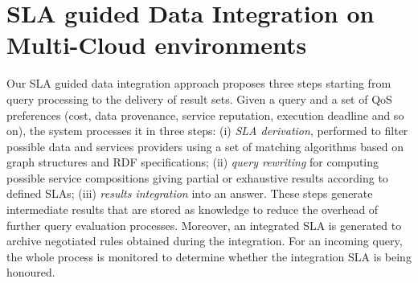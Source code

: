 \documentclass{llncs}
\begin{document}

  


 
 



\section{SLA guided Data Integration on Multi-Cloud environments}\label{sec:approach}




Our SLA guided data  integration approach proposes three steps starting from  query processing   to the delivery of  result sets.
Given a query and a set of QoS preferences (cost, data provenance, service reputation, execution deadline and so on), the system processes it in three steps:  (i)  {\em SLA derivation}, performed to filter possible data and services providers using a set of matching algorithms based on  graph structures and RDF specifications;
(ii)  {\em query rewriting} for computing possible service compositions giving partial or exhaustive  results according to defined SLAs; (iii)  {\em results  integration} into an answer. 
These steps generate intermediate results that are stored as knowledge  to reduce the overhead of further query evaluation processes. Moreover, an integrated SLA is generated to archive  negotiated rules obtained during  the integration. For an incoming query, the whole process is monitored to determine whether the integration SLA is being honoured.
\end{document}
